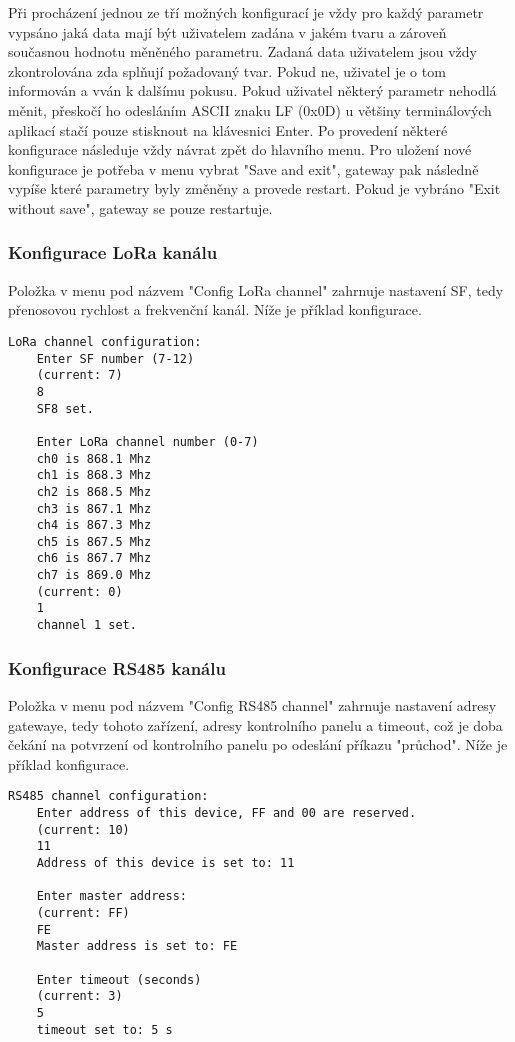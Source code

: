 Při procházení jednou ze tří možných konfigurací je vždy pro každý parametr vypsáno jaká data mají být uživatelem zadána v jakém tvaru a zároveň současnou hodnotu měněného parametru. Zadaná data uživatelem jsou vždy zkontrolována zda splňují požadovaný tvar. Pokud ne, uživatel je o tom informován a vván k dalšímu pokusu.
Pokud uživatel některý parametr nehodlá měnit, přeskočí ho odesláním ASCII znaku LF (0x0D) u většiny terminálových aplikací stačí pouze stisknout na klávesnici Enter.
Po provedení některé konfigurace následuje vždy návrat zpět do hlavního menu. Pro uložení nové konfigurace je potřeba v menu vybrat "Save and exit", gateway pak následně vypíše které parametry byly změněny a provede restart. Pokud je vybráno "Exit without save", gateway se pouze restartuje.


\subsubsection{Konfigurace LoRa kanálu}
Položka v menu pod názvem "Config LoRa channel" zahrnuje nastavení SF, tedy přenosovou rychlost a frekvenční kanál. Níže je příklad konfigurace.

\begin{lstlisting}[style=log]
    LoRa channel configuration:
    Enter SF number (7-12)
    (current: 7)
    8
    SF8 set.

    Enter LoRa channel number (0-7)
    ch0 is 868.1 Mhz
    ch1 is 868.3 Mhz
    ch2 is 868.5 Mhz
    ch3 is 867.1 Mhz
    ch4 is 867.3 Mhz
    ch5 is 867.5 Mhz
    ch6 is 867.7 Mhz
    ch7 is 869.0 Mhz
    (current: 0)
    1
    channel 1 set.
\end{lstlisting}

\subsubsection{Konfigurace RS485 kanálu}
Položka v menu pod názvem "Config RS485 channel" zahrnuje nastavení adresy gatewaye, tedy tohoto zařízení, adresy kontrolního panelu a timeout, což je doba čekání na potvrzení od kontrolního panelu po odeslání příkazu "průchod". Níže je příklad konfigurace.

\begin{lstlisting}[style=log]
    RS485 channel configuration:
    Enter address of this device, FF and 00 are reserved.
    (current: 10)
    11
    Address of this device is set to: 11

    Enter master address: 
    (current: FF)
    FE
    Master address is set to: FE

    Enter timeout (seconds)
    (current: 3)
    5
    timeout set to: 5 s
\end{lstlisting}


